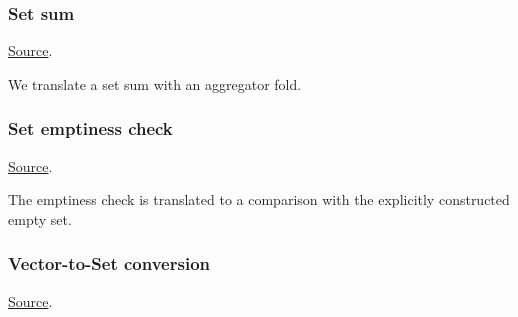 \subsubsection{ Set sum}
\href{https://github.com/saltiniroberto/ssf/blob/7ea6e18093d9da3154b4e396dd435549f687e6b9/high_level/common/pythonic_code_generic.py#L79-L80}{Source}.



\begin{mathpar}
\end{mathpar}
We translate a set sum with an aggregator fold.

\subsubsection{ Set emptiness check}
\href{https://github.com/saltiniroberto/ssf/blob/7ea6e18093d9da3154b4e396dd435549f687e6b9/high_level/common/pythonic_code_generic.py#L83-L84}{Source}.



\begin{mathpar}
\end{mathpar}
The emptiness check is translated to a comparison with the explicitly constructed empty set.

\subsubsection{ Vector-to-Set conversion}
\href{https://github.com/saltiniroberto/ssf/blob/7ea6e18093d9da3154b4e396dd435549f687e6b9/high_level/common/pythonic_code_generic.py#L87-L88}{Source}.


